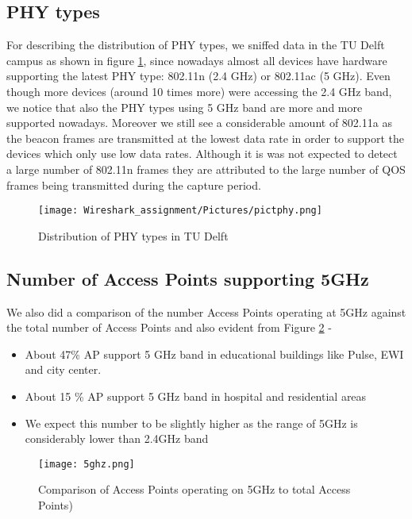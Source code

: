 \documentclass[conference]{IEEEtran}
\begin{document}
\subsection{PHY types}
For describing the distribution of PHY types, we sniffed data in the TU Delft campus as shown in figure \ref{fig:phytypes}, since nowadays almost all devices have hardware supporting the latest PHY type: 802.11n (2.4 GHz) or 802.11ac (5 GHz). Even though more devices (around 10 times more) were accessing the 2.4 GHz band, we notice that also the PHY types using 5 GHz band are more and more supported nowadays. Moreover we still see a considerable amount of 802.11a as the beacon frames are transmitted at the lowest data rate in order to support the devices which only use low data rates. Although it is was not expected to detect a large number of 802.11n frames they are attributed to the large number of QOS frames being transmitted during the capture period.
\begin{figure}[ht]
    \centering
    \texttt{[image: Wireshark\_assignment/Pictures/pictphy.png]}
    \caption{Distribution of PHY types in TU Delft}
   \label{fig:phytypes}
\end{figure}

\subsection{Number of Access Points supporting 5GHz}

We also did a comparison of the number Access Points operating at 5GHz against the total number of Access Points and also evident from Figure \ref{fig:5GHz} -

 \begin{itemize}
     \item About 47\% AP support 5 GHz band in educational buildings like Pulse, EWI and city center.
     \item About 15 \% AP support 5 GHz band in hospital and residential areas
     \item We expect this number to be slightly higher as the range of 5GHz is considerably lower than 2.4GHz band
 \end{itemize}

\begin{figure}[!h]
    \centering
    \texttt{[image: 5ghz.png]}
    \caption{Comparison of Access Points operating on 5GHz to total Access Points)}
    \label{fig:5GHz}
\end{figure}
\end{document}
